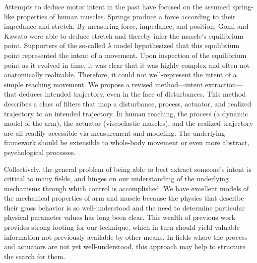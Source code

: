 \documentclass[10pt]{article}
\begin{document}
Attempts to deduce motor intent in the past have focused on the assumed spring-like properties of human muscles. Springs produce a force according to their impedance and stretch. By measuring force, impedance, and position, Gomi and Kawato\cite{gomi1997human} were able to deduce stretch and thereby infer the muscle's equilibrium point. Supporters of the so-called $\lambda$ model\cite{feldman1995origin} hypothesized that this equilibrium point represented the intent of a movement. Upon inspection of the equilibrium point as it evolved in time, it was clear that it was highly complex and often not anatomically realizable. Therefore, it could not well-represent the intent of a simple reaching movement. We propose a revised method---intent extraction---that deduces intended trajectory, even in the face of disturbances. This method describes a class of filters that map a disturbance, process, actuator, and realized trajectory to an intended trajectory. In human reaching, the process (a dynamic model of the arm), the actuator (viscoelastic muscles), and the realized trajectory are all readily accessible via measurement and modeling. The underlying framework should be extensible to whole-body movement or even more abstract, psychological processes.

Collectively, the general problem of being able to best extract someone's intent is critical to many fields, and hinges on our understanding of the underlying mechanisms through which control is accomplished. We have excellent models of the mechanical properties of arm and muscle because the physics that describe their gross behavior is so well-understood and the need to determine particular physical parameter values has long been clear. This wealth of previous work provides strong footing for our technique, which in turn should yield valuable information not previously available by other means. In fields where the process and actuators are not yet well-understood, this approach may help to structure the search for them.
\end{document}
